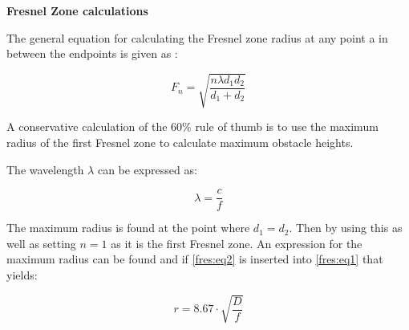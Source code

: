 



\textbf{Fresnel Zone calculations}

The general equation for calculating the Fresnel zone radius at any point a in between the endpoints is given as \citep{introRF}:

\begin{equation}
F_{n} = \sqrt{\frac{n \lambda d_{1} d_{2}}{d_{1}+d_{2}}}
\label{fres:eq1}
\end{equation}

\begin{where}
\end{where}

A conservative calculation of the $60\%$ rule of thumb is to use the maximum radius of the first Fresnel zone to calculate maximum obstacle heights. %


The wavelength $\lambda$ can be expressed as:

\begin{equation}
\lambda = \frac{c}{f}
\label{fres:eq2}
\end{equation}

\begin{where}
\end{where}






The maximum radius is found at the point where $d_{1} = d_{2}$. Then by using this as well as setting $n=1$ as it is the first Fresnel zone. An expression for the maximum radius can be found and if \autoref{fres:eq2} is inserted into \autoref{fres:eq1} that yields:


\begin{equation}
r = 8.67 \cdot \sqrt{\frac{D}{f}}
\label{fres:eq3}
\end{equation}

